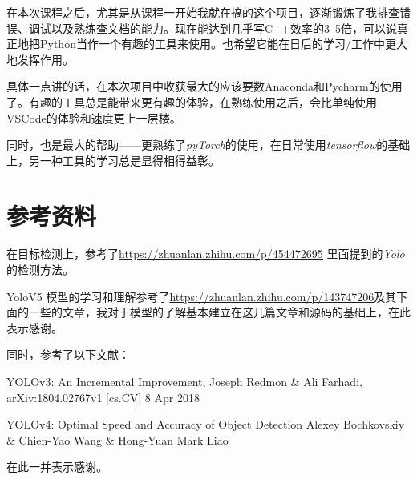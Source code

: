 \documentclass[a4paper]{ltxdoc}
\begin{document}
在本次课程之后，尤其是从课程一开始我就在搞的这个项目，逐渐锻炼了我排查错误、调试以及熟练查文档的能力。现在能达到几乎写C++效率的3~5倍，可以说真正地把Python当作一个有趣的工具来使用。也希望它能在日后的学习/工作中更大地发挥作用。

具体一点讲的话，在本次项目中收获最大的应该要数Anaconda和Pycharm的使用了。有趣的工具总是能带来更有趣的体验，在熟练使用之后，会比单纯使用VSCode的体验和速度更上一层楼。

同时，也是最大的帮助——更熟练了\textit{pyTorch}的使用，在日常使用\textit{tensorflow}的基础上，另一种工具的学习总是显得相得益彰。

\section{参考资料}

在目标检测上，参考了\url {https://zhuanlan.zhihu.com/p/454472695} 里面提到的\textit{Yolo}的检测方法。

YoloV5 模型的学习和理解参考了\url {https://zhuanlan.zhihu.com/p/143747206}及其下面的一些的文章，我对于模型的了解基本建立在这几篇文章和源码的基础上，在此表示感谢。

同时，参考了以下文献：

YOLOv3: An Incremental Improvement, Joseph Redmon \& Ali Farhadi, arXiv:1804.02767v1 [cs.CV] 8 Apr 2018

YOLOv4: Optimal Speed and Accuracy of Object Detection Alexey Bochkovskiy \& Chien-Yao Wang \& Hong-Yuan Mark Liao

在此一并表示感谢。
\end{document}
